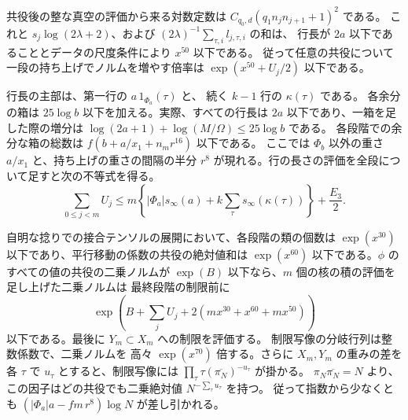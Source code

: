 共役後の整な真空の評価から来る対数定数は
\(C_{q_0,d}(q_1 n_j n_{j+1}+1)^2\) である。
これと \(s_j\log(2\lambda+2)\)、および
\((2\lambda)^{-1}\sum_{\tau,i}l_{j,\tau,i}\) の和は、
行長が \(2a\) 以下であることとデータの尺度条件により \(x^{50}\) 以下である。
従って任意の共役について一段の持ち上げでノルムを増やす倍率は
\(\exp(x^{50}+U_j/2)\) 以下である。

行長の主部は、第一行の \(a\,1_{\Phi_a}(\tau)\) と、
続く \(k-1\) 行の \(\kappa(\tau)\) である。
各余分の箱は \(25\log b\) 以下を加える。実際、すべての行長は
\(2a\) 以下であり、一箱を足した際の増分は
\(\log(2a+1)+\log(M/\Omega)\le25\log b\) である。
各段階での余分な箱の総数は
\(f(b+a/x_1+n_m r^{16})\) 以下である。
ここでは \(\Phi_b\) 以外の重さ \(a/x_1\) と、持ち上げの重さの間隔の半分
\(r^8\) が現れる。行の長さの評価を全段について足すと次の不等式を得る。
\begin{equation}\label{eq:upper-rows}
 \sum_{0\le j<m}U_j
 \le m\left\{|\Phi_a|s_\infty(a)+k\sum_\tau s_\infty(\kappa(\tau))\right\}
         +\frac{E_3}{2}.
\end{equation}

自明な捻りでの接合テンソルの展開において、各段階の類の個数は
\(\exp(x^{30})\) 以下であり、平行移動の係数の共役の絶対値和は
\(\exp(x^{60})\) 以下である。\(\phi\) のすべての値の共役の二乗ノルムが
\(\exp(B)\) 以下なら、\(m\) 個の核の積の評価を足し上げた二乗ノルムは
最終段階の制限前に
\[
  \exp\!\left(B+\sum_j U_j
             +2(mx^{30}+x^{60}+mx^{50})\right)
\]
以下である。最後に \(Y_m\subset X_m\) への制限を評価する。
制限写像の分岐行列は整数係数で、二乗ノルムを
高々 \(\exp(x^{70})\) 倍する。さらに \(X_m,Y_m\) の重みの差を
各 \(\tau\) で \(u_\tau\) とすると、制限写像には
\(\prod_\tau \tau(\overline{\pi_N})^{-u_\tau}\) が掛かる。
\(\pi_N\overline{\pi_N}=N\) より、この因子はどの共役でも二乗絶対値
\(N^{-\sum_\tau u_\tau}\) を持つ。
従って指数から少なくとも
\((|\Phi_a|a-fm\,r^8)\log N\) が差し引かれる。

